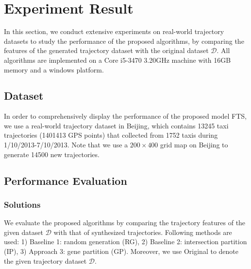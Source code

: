 
\section{Experiment Result}\label{Experiment Result}
In this section, we conduct extensive experiments on real-world trajectory datasets to study the performance of the proposed algorithms, by comparing the features of the generated trajectory dataset with the original dataset $\mathcal{D}$. All algorithms are implemented on a Core i5-3470 3.20GHz machine with 16GB memory and a windows platform.

\subsection{Dataset}

In order to comprehensively display the performance of the proposed model FTS, we use a real-world trajectory dataset in Beijing, which contains 13245 taxi trajectories (1401413 GPS points) that collected from 1752 taxis during 1/10/2013-7/10/2013. Note that we use a $200\times400$ grid map on Beijing to generate 14500 new trajectories.


\subsection{Performance Evaluation}
\subsubsection{Solutions}
We evaluate the proposed algorithms by comparing the trajectory features of the given dataset $\mathcal{D}$ with that of synthesized trajectories. Following methods are used:   1) Baseline 1: random generation (RG), 2) Baseline 2: intersection partition (IP), 3) Approach 3: gene partition (GP). Moreover, we use Original to denote the given trajectory dataset $\mathcal{D}$.


